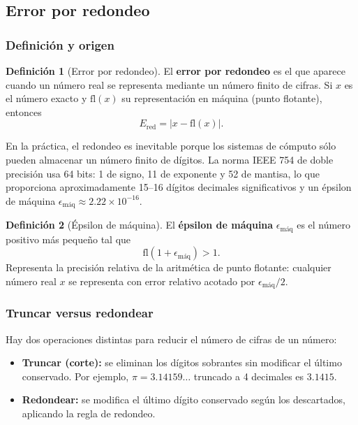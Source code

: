\documentclass[a4paper,12pt]{article}
\newcommand{\fl}{\mathrm{fl}}
\theoremstyle{definition}
\newtheorem{definicion}{Definición}[section]
\theoremstyle{plain}
\begin{document}
\subsection{Error por redondeo}

\subsubsection{Definición y origen}

\begin{definicion}[Error por redondeo]
El \textbf{error por redondeo} es el que aparece cuando un número real se
representa mediante un número finito de cifras. Si $x$ es el número exacto y
$\fl(x)$ su representación en máquina (punto flotante), entonces
\[
    E_{\mathrm{red}} = |x - \fl(x)|.
\]
\end{definicion}

En la práctica, el redondeo es inevitable porque los sistemas de cómputo sólo
pueden almacenar un número finito de dígitos. La norma IEEE 754 de doble
precisión usa 64 bits: 1 de signo, 11 de exponente y 52 de mantisa, lo que
proporciona aproximadamente 15--16 dígitos decimales significativos y un épsilon
de máquina $\epsilon_{\mathrm{máq}} \approx 2.22 \times 10^{-16}$.

\begin{definicion}[Épsilon de máquina]
El \textbf{épsilon de máquina} $\epsilon_{\mathrm{máq}}$ es el número positivo
más pequeño tal que
\[
    \fl(1 + \epsilon_{\mathrm{máq}}) > 1.
\]
Representa la precisión relativa de la aritmética de punto flotante: cualquier
número real $x$ se representa con error relativo acotado por
$\epsilon_{\mathrm{máq}}/2$.
\end{definicion}

\subsubsection{Truncar versus redondear}

Hay dos operaciones distintas para reducir el número de cifras de un número:

\begin{itemize}[leftmargin=1.5em]
    \item \textbf{Truncar (corte):} se eliminan los dígitos sobrantes sin
          modificar el último conservado. Por ejemplo, $\pi = 3.14159\ldots$
          truncado a 4 decimales es $3.1415$.
    \item \textbf{Redondear:} se modifica el último dígito conservado según los
          descartados, aplicando la regla de redondeo.
\end{itemize}
\end{document}
